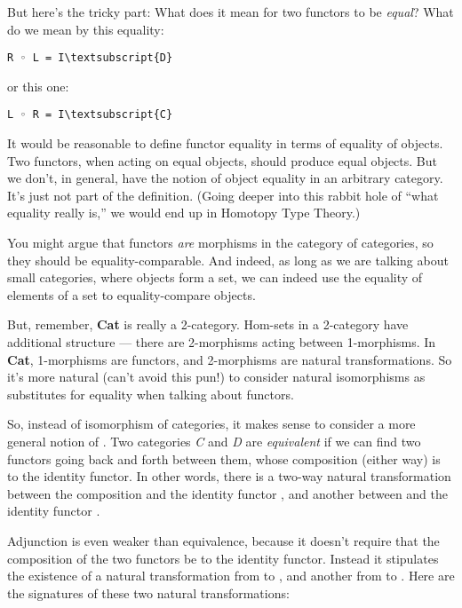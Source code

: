 \noindent
But here's the tricky part: What does it mean for two functors to be
\emph{equal}? What do we mean by this equality:

\begin{Verbatim}[commandchars=\\\{\}]
R ◦ L = I\textsubscript{D}
\end{Verbatim}
or this one:

\begin{Verbatim}[commandchars=\\\{\}]
L ◦ R = I\textsubscript{C}
\end{Verbatim}
It would be reasonable to define functor equality in terms of equality
of objects. Two functors, when acting on equal objects, should produce
equal objects. But we don't, in general, have the notion of object
equality in an arbitrary category. It's just not part of the definition.
(Going deeper into this rabbit hole of ``what equality really is,'' we
would end up in Homotopy Type Theory.)

You might argue that functors \emph{are} morphisms in the category of
categories, so they should be equality-comparable. And indeed, as long
as we are talking about small categories, where objects form a set, we
can indeed use the equality of elements of a set to equality-compare
objects.

But, remember, \textbf{Cat} is really a 2-category. Hom-sets in a
2-category have additional structure --- there are 2-morphisms acting
between 1-morphisms. In \textbf{Cat}, 1-morphisms are functors, and
2-morphisms are natural transformations. So it's more natural (can't
avoid this pun!) to consider natural isomorphisms as substitutes for
equality when talking about functors.

So, instead of isomorphism of categories, it makes sense to consider a
more general notion of . Two categories \emph{C} and
\emph{D} are \emph{equivalent} if we can find two functors going back
and forth between them, whose composition (either way) is
 to the identity functor. In other words,
there is a two-way natural transformation between the composition
 and the identity functor , and another
between  and the identity functor .

Adjunction is even weaker than equivalence, because it doesn't require
that the composition of the two functors be  to the
identity functor. Instead it stipulates the existence of a  natural transformation from  to , and
another from  to . Here are the signatures of
these two natural transformations:

